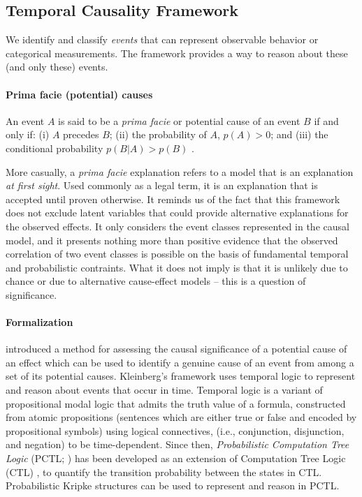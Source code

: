 \subsection{Temporal Causality Framework}
We identify and classify \emph{events} that can represent observable behavior or categorical measurements.  The framework provides a way to reason about these (and only these) events.

\paragraph{Prima facie (potential) causes}
An event \emph{$A$} is said to be a \emph{prima facie} or potential cause of an event \emph{$B$} if and only if: (i) \emph{$A$} precedes \textit{$B$}; (ii) the probability of $A$, $p(A)>0$; and (iii) the conditional probability $p(B|A)>p(B)$ \parencite{suppes1970probabilistic}.

More casually, a \emph{prima facie} explanation refers to a model that is an explanation \emph{at first sight}.  Used commonly as a legal term, it is an explanation that is accepted until proven otherwise.   It  reminds us of the fact that this framework does not exclude latent variables that could provide alternative explanations for the observed effects.  It only considers the event classes represented in the causal model, and it presents nothing more than positive evidence that the observed correlation of two event classes is possible on the basis of fundamental temporal and probabilistic contraints. What it does not imply is that it is unlikely due to chance or due to alternative cause-effect models -- this is a question of significance.


\paragraph{Formalization} \textcite{kleinberg2012causality} introduced a method for assessing the causal significance of a potential cause of an effect which can be used to identify a genuine cause of an event from among a set of its potential causes. Kleinberg's framework uses temporal logic \parencite{prior1967past} to represent and reason about events that occur in time. Temporal logic is a variant of propositional modal logic that admits the truth value of a formula, constructed from atomic propositions (sentences which are either true or false and encoded by propositional symbols) using logical connectives, (i.e., conjunction, disjunction, and negation) to be time-dependent. Since then, \emph{Probabilistic Computation Tree Logic} (PCTL; \cite{hansson1994logic}) has been developed as an extension of  Computation Tree Logic (CTL) \parencite{clarke1999model}, to quantify the transition probability between the states in CTL. Probabilistic Kripke structures \parencite{clarke1999model} can be used to represent and reason in PCTL.

